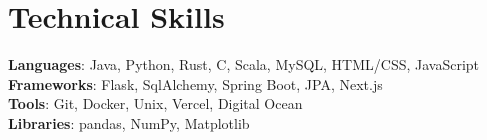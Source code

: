 \documentclass[letterpaper,11pt]{article}
\makeatletter
\newcommand{\resumeItem}[1]{
  \item\small{
    {#1 \vspace{-2pt}}
  }
}
\newcommand{\resumeSubheading}[4]{
  \vspace{-2pt}\item
    \begin{tabular*}{0.97\textwidth}[t]{l@{\extracolsep{\fill}}r}
      \textbf{#1} & #2 \\
      \textit{\small#3} & \textit{\small #4} \\
    \end{tabular*}\vspace{-7pt}
}
\newcommand{\resumeSubHeadingListEnd}{\end{itemize}}
\newcommand{\resumeItemListStart}{\begin{itemize}}
\newcommand{\resumeItemListEnd}{\end{itemize}\vspace{-5pt}}
\makeatother
\begin{document}



%
\section{Technical Skills}
 \begin{itemize}[leftmargin=0.15in, label={}]
    \small{\item{
     \textbf{Languages}{: Java, Python, Rust, C, Scala, MySQL, HTML/CSS, JavaScript} \\
     \textbf{Frameworks}{: Flask, SqlAlchemy, Spring Boot, JPA, Next.js} \\
     \textbf{Tools}{: Git, Docker, Unix, Vercel, Digital Ocean} \\
     \textbf{Libraries}{: pandas, NumPy, Matplotlib}
    }}
 \end{itemize}

\end{document}
